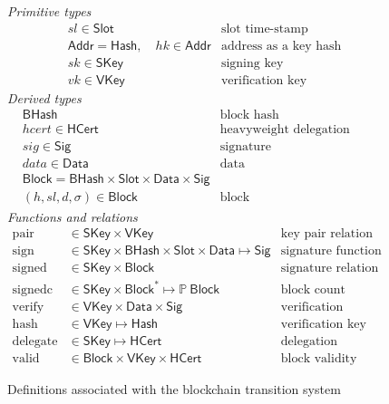 \documentclass[11pt,a4paper]{article}
\newcommand{\powerset}[1]{\mathbb{P}~#1}
\newcommand{\type}[1]{\mathsf{#1}}
\newcommand{\seqof}[1]{#1^{*}}
\newcommand{\Hash}{\type{Hash}}    %
\newcommand{\BHash}{\type{BHash}}  %
\newcommand{\Addr}{\type{Addr}}
\newcommand{\Slot}{\type{Slot}}
\newcommand{\Block}{\type{Block}}
\newcommand{\HCert}{\type{HCert}}
\newcommand{\SKey}{\type{SKey}}
\newcommand{\VKey}{\type{VKey}}
\newcommand{\Sig}{\type{Sig}}
\newcommand{\Data}{\type{Data}}
\newcommand{\hashname}{hash}
\newcommand{\signname}{sign}
\newcommand{\signedname}{signed}
\newcommand{\signedseq}{signedc}
\newcommand{\verifyname}{verify}
\newcommand{\delegatename}{delegate}
\newcommand{\validname}{valid}
\newcommand{\keypairname}{pair}
\begin{document}
\begin{figure}[h]
  \emph{Primitive types}
  \begin{align*}
    & sl \in \Slot & \text{slot time-stamp}\\
    & \Addr = \Hash,\quad hk \in \Addr & \text{address as a key hash}\\
    & sk \in \SKey & \text{signing key}\\
    & vk \in \VKey & \text{verification key}
  \end{align*}
  \emph{Derived types}
  \begin{align*}
    & \BHash & \text{block hash}\\
    & hcert \in \HCert & \text{heavyweight delegation certificate}\\
    & sig \in \Sig  & \text{signature}\\
    & data \in \Data  & \text{data}\\
    & \Block = \BHash \times \Slot \times \Data \times \Sig & \\
    & (h, sl, d, \sigma) \in \Block
      & \text{block}
  \end{align*}
  \emph{Functions and relations}
  \begin{align*}
    \text{\keypairname} & \in \SKey \times \VKey & \text{key pair relation}\\
    \text{\signname} & \in \SKey \times \BHash \times \Slot \times \Data \mapsto \Sig
      & \text{signature function}\\
    \text{\signedname} & \in \SKey \times \Block & \text{signature relation}\\
    \text{\signedseq} & \in \SKey \times \seqof{\Block} \mapsto \powerset{\Block}
      & \text{block count function}\\
    \text{\verifyname} & \in \VKey \times \Data \times \Sig
      & \text{verification relation}\\
    \text{\hashname} & \in \VKey \mapsto \Hash
      & \text{verification key hash function}\\
    \text{\delegatename} & \in \SKey \mapsto \HCert
      & \text{delegation function}\\
    \text{\validname} & \in \Block \times \VKey \times \HCert
      & \text{block validity relation}
  \end{align*}
  \caption{Definitions associated with the blockchain transition system}
  \label{fig:state-trans-abstract}
\end{figure}
\end{document}
